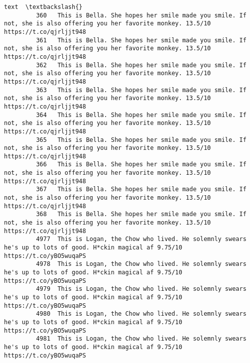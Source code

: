 \documentclass[11pt]{article}
\begin{document}
\begin{Verbatim}[commandchars=\\\{\}]
                                                                                                                                                                            text  \textbackslash{}
         360   This is Bella. She hopes her smile made you smile. If not, she is also offering you her favorite monkey. 13.5/10 https://t.co/qjrljjt948                            
         361   This is Bella. She hopes her smile made you smile. If not, she is also offering you her favorite monkey. 13.5/10 https://t.co/qjrljjt948                            
         362   This is Bella. She hopes her smile made you smile. If not, she is also offering you her favorite monkey. 13.5/10 https://t.co/qjrljjt948                            
         363   This is Bella. She hopes her smile made you smile. If not, she is also offering you her favorite monkey. 13.5/10 https://t.co/qjrljjt948                            
         364   This is Bella. She hopes her smile made you smile. If not, she is also offering you her favorite monkey. 13.5/10 https://t.co/qjrljjt948                            
         365   This is Bella. She hopes her smile made you smile. If not, she is also offering you her favorite monkey. 13.5/10 https://t.co/qjrljjt948                            
         366   This is Bella. She hopes her smile made you smile. If not, she is also offering you her favorite monkey. 13.5/10 https://t.co/qjrljjt948                            
         367   This is Bella. She hopes her smile made you smile. If not, she is also offering you her favorite monkey. 13.5/10 https://t.co/qjrljjt948                            
         368   This is Bella. She hopes her smile made you smile. If not, she is also offering you her favorite monkey. 13.5/10 https://t.co/qjrljjt948                            
         4977  This is Logan, the Chow who lived. He solemnly swears he's up to lots of good. H*ckin magical af 9.75/10 https://t.co/yBO5wuqaPS                                    
         4978  This is Logan, the Chow who lived. He solemnly swears he's up to lots of good. H*ckin magical af 9.75/10 https://t.co/yBO5wuqaPS                                    
         4979  This is Logan, the Chow who lived. He solemnly swears he's up to lots of good. H*ckin magical af 9.75/10 https://t.co/yBO5wuqaPS                                    
         4980  This is Logan, the Chow who lived. He solemnly swears he's up to lots of good. H*ckin magical af 9.75/10 https://t.co/yBO5wuqaPS                                    
         4981  This is Logan, the Chow who lived. He solemnly swears he's up to lots of good. H*ckin magical af 9.75/10 https://t.co/yBO5wuqaPS                                    

\end{Verbatim}
\end{document}

